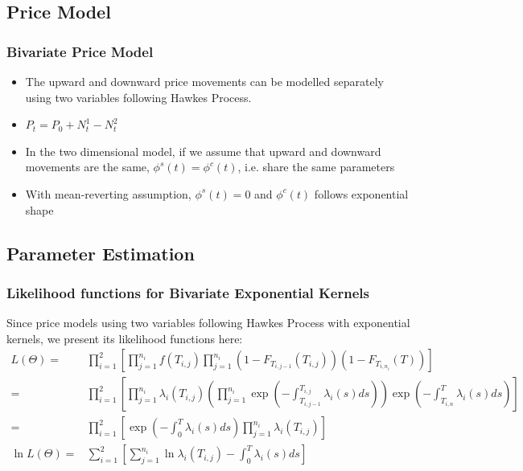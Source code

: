 \documentclass{beamer}
\begin{document}
\subsection{Price Model}
\begin{frame}
\frametitle{Bivariate Price Model}
\begin{itemize}
	\item The upward and downward price movements can be modelled separately using two variables following Hawkes Process.
	\item $P_t = P_0 + N_t^1 - N_t^2$
	\item In the two dimensional model, if we assume that upward and downward movements are the same, $\phi^s(t) = \phi^c(t)$, i.e. share the same parameters
	\item With mean-reverting assumption, $\phi^s(t) = 0$ and $\phi^c(t)$ follows exponential shape
\end{itemize}
\end{frame}

\subsection{Parameter Estimation}
\begin{frame}
\frametitle{Likelihood functions for Bivariate Exponential Kernels}
Since price models using two variables following Hawkes Process with exponential kernels, we present its likelihood functions here:
\begin{equation*}
\begin{split}
L(\Theta) = &\prod_{i=1}^2 \left[ \prod_{j=1}^{n_i} f(T_{i,j}) \prod_{j=1}^{n_i} (1-F_{T_{i,j-1}}(T_{i,j})) (1-F_{T_{i,n_i}}(T)) \right]\\
= &\prod_{i=1}^2 \left[ \prod_{j=1}^{n_i} \lambda_i(T_{i,j}) \left(\prod_{j=1}^{n_i} \exp(-\int_{T_{i,j-1}}^{T_{i,j}} \lambda_i(s) ds)\right) \exp \left(-\int_{T_{i,n}}^{T} \lambda_i(s) ds\right) \right]\\
= &\prod_{i=1}^2 \left[ \exp \left(-\int_{0}^{T} \lambda_i(s) ds\right) \prod_{j=1}^{n_i} \lambda_i(T_{i,j}) \right]\\
\ln L(\Theta) = & \sum_{i=1}^2 \left[ \sum_{j=1}^{n_i} \ln \lambda_i(T_{i,j})  -\int_{0}^{T} \lambda_i(s) ds \right]\\
\end{split}
\end{equation*}
\end{frame}
\end{document}

